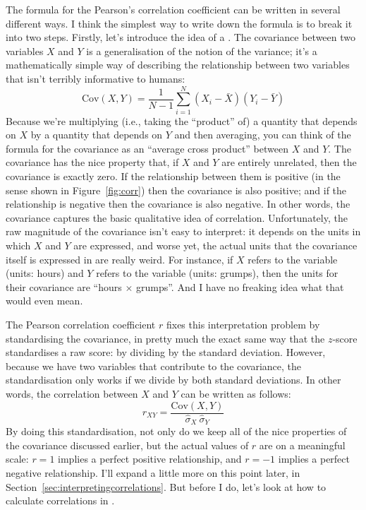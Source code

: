 
The formula for the Pearson's correlation coefficient can be written in several different ways. I think the simplest way to write down the formula is to break it into two steps. Firstly, let's introduce the idea of a . The covariance between two variables $X$ and $Y$ is a generalisation of the notion of the variance; it's a mathematically simple way of describing the relationship between two variables that isn't terribly informative to humans:
$$
\mbox{Cov}(X,Y) = \frac{1}{N-1} \sum_{i=1}^N \left( X_i - \bar{X} \right) \left( Y_i - \bar{Y} \right)
$$
Because we're multiplying (i.e., taking the ``product'' of) a quantity that depends on $X$ by a quantity that depends on $Y$ and then averaging, you can think of the formula for the covariance as an ``average cross product'' between $X$ and $Y$. The covariance has the nice property that, if $X$ and $Y$ are entirely unrelated, then the covariance is exactly zero. If the relationship between them is positive (in the sense shown in Figure~\ref{fig:corr}) then the covariance is also positive; and if the relationship is negative then the covariance is also negative. In other words, the covariance captures the basic qualitative idea of correlation. Unfortunately, the raw magnitude of the covariance isn't easy to interpret: it depends on the units in which $X$ and $Y$ are expressed, and worse yet, the actual units that the covariance itself is expressed in are really weird. For instance, if $X$ refers to the  variable (units: hours) and $Y$ refers to the  variable (units: grumps), then the units for their covariance are ``hours $\times$ grumps''. And I have no freaking idea what that would even mean. 

The Pearson correlation coefficient $r$ fixes this interpretation problem by standardising the covariance, in pretty much the exact same way that the $z$-score standardises a raw score: by dividing by the standard deviation. However, because we have two variables that contribute to the covariance, the standardisation only works if we divide by both standard deviations.  In other words, the correlation between $X$ and $Y$ can be written as follows:
$$
r_{XY}  = \frac{\mbox{Cov}(X,Y)}{ \hat{\sigma}_X \ \hat{\sigma}_Y}
$$
By doing this standardisation, not only do we keep all of the nice properties of the covariance discussed earlier, but the actual values of $r$ are on a meaningful scale: $r= 1$ implies a perfect positive relationship, and $r = -1$ implies a perfect negative relationship. I'll expand a little more on this point later, in Section~\ref{sec:interpretingcorrelations}. But before I do, let's look at how to calculate correlations in \R.

